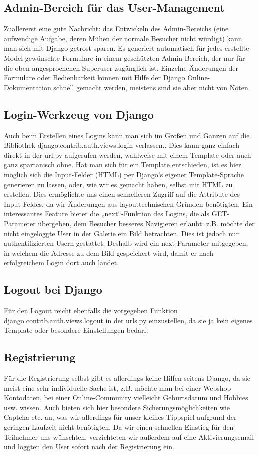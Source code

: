 \documentclass[titlepage, 12pt,a4paper]{scrartcl}
\begin{document}
\subsection{Admin-Bereich für das User-Management}
Zuallererst eine gute Nachricht: das Entwickeln des Admin-Bereichs  (eine
aufwendige Aufgabe, deren Mühen der normale Besucher nicht würdigt) kann man 
sich mit Django getrost sparen. Es generiert automatisch für jedes erstellte 
Model gewünschte Formulare in einem geschützten Admin-Bereich, der nur für die 
oben angesprochenen Superuser zugänglich ist. Einzelne Änderungen der Formulare
oder Bedienbarkeit können mit Hilfe der Django Online-Dokumentation schnell 
gemacht werden, meistens sind sie aber nicht von Nöten.


\subsection{Login-Werkzeug von Django}
Auch beim Erstellen eines Logins kann man sich im Großen und Ganzen auf die 
Bibliothek django.contrib.auth.views.login verlassen.. Dies kann ganz einfach 
direkt in der url.py aufgerufen werden, wahlweise mit einem Template oder auch 
ganz spartanisch ohne. Hat man sich für ein Template entschieden, ist es hier 
möglich sich die Input-Felder (HTML) per Django's eigener Template-Sprache 
generieren zu lassen, oder, wie wir es gemacht haben, selbst mit HTML zu 
erstellen. Dies ermöglichte uns einen schnelleren Zugriff auf die Attribute des
Input-Feldes, da wir Änderungen aus layouttechnischen Gründen benötigten. Ein 
interessantes Feature bietet die „next“-Funktion des Logins, die als 
GET-Parameter übergeben, dem Besucher besseres Navigieren erlaubt: z.B. möchte 
der nicht eingeloggte User in der Galerie ein Bild betrachten. Dies ist jedoch 
nur authentifizierten Usern gestattet. Deshalb wird ein next-Parameter 
mitgegeben, in welchem die Adresse zu dem Bild gespeichert wird, damit er nach 
erfolgreichem Login dort auch landet.


\subsection{Logout bei Django}
Für den Logout reicht ebenfalls die vorgegeben Funktion 
django.contrib.auth.views.logout in der urls.py einzustellen, da sie ja kein 
eigenes Template oder besondere Einstellungen bedarf.


\subsection{Registrierung}
Für die Registrierung selbst gibt es allerdings keine Hilfen seitens Django, da
sie meist eine sehr individuelle Sache ist, z.B. möchte man bei einer Webshop 
Kontodaten, bei einer Online-Community vielleicht Geburtsdatum und Hobbies usw.
wissen. Auch bieten sich hier besondere Sicherungsmöglichkeiten wie Captcha
etc.  an, was wir allerdings für unser kleines Tippspiel aufgrund der geringen 
Laufzeit nicht benötigten. Da wir einen schnellen Einstieg für den Teilnehmer 
uns wünschten, verzichteten wir außerdem auf eine Aktivierungsemail und loggten
den User sofort nach der Registrierung ein.
\end{document}
